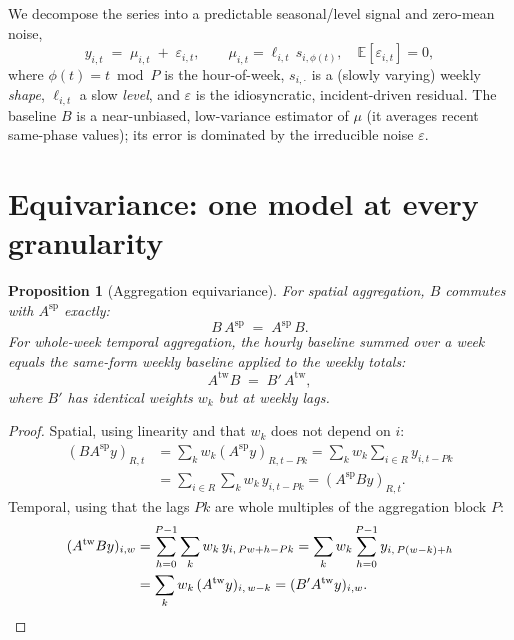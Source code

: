 \documentclass[11pt]{article}
\theoremstyle{plain}
\newtheorem{proposition}{Proposition}
\theoremstyle{remark}
\newcommand{\E}{\mathbb{E}}
\begin{document}
We decompose the series into a predictable seasonal/level signal and zero-mean
noise,
\begin{equation}
y_{i,t} \;=\; \mu_{i,t} \;+\; \varepsilon_{i,t},
\qquad \mu_{i,t}=\ell_{i,t}\, s_{i,\phi(t)},\quad \E[\varepsilon_{i,t}]=0,
\label{eq:decomp}
\end{equation}
where $\phi(t)=t\bmod P$ is the hour-of-week, $s_{i,\cdot}$ is a (slowly varying)
weekly \emph{shape}, $\ell_{i,t}$ a slow \emph{level}, and $\varepsilon$ is the
idiosyncratic, incident-driven residual. The baseline $B$ is a near-unbiased,
low-variance estimator of $\mu$ (it averages recent same-phase values); its error
is dominated by the irreducible noise $\varepsilon$.

\section{Equivariance: one model at every granularity}

\begin{proposition}[Aggregation equivariance]\label{prop:equi}
For spatial aggregation, $B$ commutes with $A^{\mathrm{sp}}$ exactly:
\[
B\,A^{\mathrm{sp}} \;=\; A^{\mathrm{sp}}\,B .
\]
For whole-week temporal aggregation, the hourly baseline summed over a week equals
the \emph{same-form} weekly baseline applied to the weekly totals:
\[
A^{\mathrm{tw}} B \;=\; B'\, A^{\mathrm{tw}},
\]
where $B'$ has identical weights $w_k$ but at weekly lags.
\end{proposition}

\begin{proof}
Spatial, using linearity and that $w_k$ does not depend on $i$:
\begin{align*}
(B A^{\mathrm{sp}} y)_{R,t}
&= \sum_{k} w_k (A^{\mathrm{sp}} y)_{R,t-Pk}
 = \sum_{k} w_k \sum_{i\in R} y_{i,t-Pk}\\
&= \sum_{i\in R} \sum_{k} w_k\, y_{i,t-Pk}
 = (A^{\mathrm{sp}} B y)_{R,t}.
\end{align*}
Temporal, using that the lags $Pk$ are whole multiples of the aggregation block $P$:
\begin{align*}
(A^{\mathrm{tw}} B y)_{i,w}
&= \sum_{h=0}^{P-1} \sum_{k} w_k\, y_{i,\,Pw+h-Pk}
 = \sum_{k} w_k \sum_{h=0}^{P-1} y_{i,\,P(w-k)+h}\\
&= \sum_{k} w_k\, (A^{\mathrm{tw}} y)_{i,\,w-k}
 = (B' A^{\mathrm{tw}} y)_{i,w}. \qquad\qedhere
\end{align*}
\end{proof}
\end{document}
